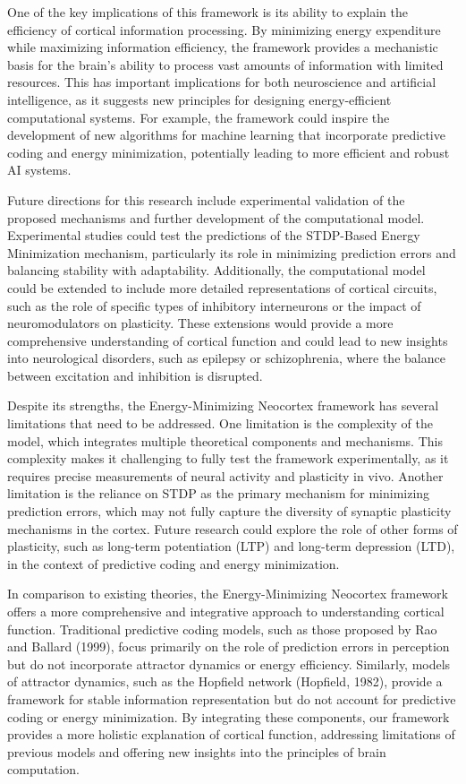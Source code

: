 \documentclass{article}
\begin{document}
One of the key implications of this framework is its ability to explain the efficiency of cortical information processing. By minimizing energy expenditure while maximizing information efficiency, the framework provides a mechanistic basis for the brain's ability to process vast amounts of information with limited resources. This has important implications for both neuroscience and artificial intelligence, as it suggests new principles for designing energy-efficient computational systems. For example, the framework could inspire the development of new algorithms for machine learning that incorporate predictive coding and energy minimization, potentially leading to more efficient and robust AI systems.

Future directions for this research include experimental validation of the proposed mechanisms and further development of the computational model. Experimental studies could test the predictions of the STDP-Based Energy Minimization mechanism, particularly its role in minimizing prediction errors and balancing stability with adaptability. Additionally, the computational model could be extended to include more detailed representations of cortical circuits, such as the role of specific types of inhibitory interneurons or the impact of neuromodulators on plasticity. These extensions would provide a more comprehensive understanding of cortical function and could lead to new insights into neurological disorders, such as epilepsy or schizophrenia, where the balance between excitation and inhibition is disrupted.

Despite its strengths, the Energy-Minimizing Neocortex framework has several limitations that need to be addressed. One limitation is the complexity of the model, which integrates multiple theoretical components and mechanisms. This complexity makes it challenging to fully test the framework experimentally, as it requires precise measurements of neural activity and plasticity in vivo. Another limitation is the reliance on STDP as the primary mechanism for minimizing prediction errors, which may not fully capture the diversity of synaptic plasticity mechanisms in the cortex. Future research could explore the role of other forms of plasticity, such as long-term potentiation (LTP) and long-term depression (LTD), in the context of predictive coding and energy minimization.

In comparison to existing theories, the Energy-Minimizing Neocortex framework offers a more comprehensive and integrative approach to understanding cortical function. Traditional predictive coding models, such as those proposed by Rao and Ballard (1999), focus primarily on the role of prediction errors in perception but do not incorporate attractor dynamics or energy efficiency. Similarly, models of attractor dynamics, such as the Hopfield network (Hopfield, 1982), provide a framework for stable information representation but do not account for predictive coding or energy minimization. By integrating these components, our framework provides a more holistic explanation of cortical function, addressing limitations of previous models and offering new insights into the principles of brain computation.
\end{document}
